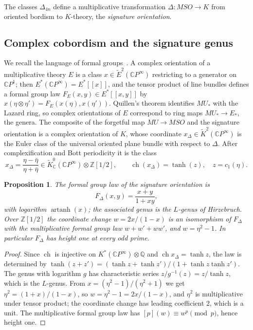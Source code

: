 \documentclass[11pt]{amsart}
\theoremstyle{plain}
\newtheorem{proposition}[theorem]{Proposition}
\theoremstyle{definition}
\numberwithin{equation}{section}
\newcommand{\Z}{\mathbb{Z}}
\newcommand{\Q}{\mathbb{Q}}
\newcommand{\C}{\mathbb{C}}
\newcommand{\CP}{\mathbb{C}P}
\DeclareMathOperator{\ch}{ch}
\begin{document}
The classes $\Delta_{4n}$ define a multiplicative transformation $\Delta\colon MSO\to K$ from oriented bordism to $K$-theory, the \emph{signature orientation}.

\subsection{Complex cobordism and the signature genus}
We recall the language of formal groups~\cite{Quillen,Ravenel}.
A complex orientation of a multiplicative theory $E$ is a class $x\in\widetilde E^2(\CP^\infty)$ restricting to a generator on $\CP^1$; then $E^*(\CP^\infty)=E^*[[x]]$, and the tensor product of line bundles defines a formal group law $F_E(x,y)\in E^*[[x,y]]$ by $x(\eta\otimes\eta')=F_E(x(\eta),x(\eta'))$.
Quillen's theorem identifies $MU_*$ with the Lazard ring, so complex orientations of $E$ correspond to ring maps $MU_*\to E_*$, the genera.
The composite of the forgetful map $MU\to MSO$ and the signature orientation is a complex orientation of $K$, whose coordinate $x_\Delta\in\widetilde K^2(\CP^\infty)$ is the Euler class of the universal oriented plane bundle with respect to $\Delta$.
After complexification and Bott periodicity it is the class
\[
x_\Delta=\frac{\eta-\bar\eta}{\eta+\bar\eta}\in\widetilde K_{\C}^0(\CP^\infty)\otimes\Z[1/2],\qquad \ch(x_\Delta)=\tanh(z),\quad z=c_1(\eta).
\]

\begin{proposition}\label{prop:signatureFGL}
The formal group law of the signature orientation is
\[
F_\Delta(x,y)=\frac{x+y}{1+xy},
\]
with logarithm $\operatorname{artanh}(x)$; the associated genus is the $L$-genus of Hirzebruch.
Over $\Z[1/2]$ the coordinate change $w=2x/(1-x)$ is an isomorphism of $F_\Delta$ with the multiplicative formal group law $w+w'+ww'$, and $w=\eta^2-1$.
In particular $F_\Delta$ has height one at every odd prime.
\end{proposition}

\begin{proof}
Since $\ch$ is injective on $K^*(\CP^\infty)\otimes\Q$ and $\ch x_\Delta=\tanh z$, the law is determined by $\tanh(z+z')=(\tanh z+\tanh z')/(1+\tanh z\tanh z')$.
The genus with logarithm $g$ has characteristic series $z/g^{-1}(z)=z/\tanh z$, which is the $L$-genus.
From $x=(\eta^2-1)/(\eta^2+1)$ we get $\eta^2=(1+x)/(1-x)$, so $w=\eta^2-1=2x/(1-x)$, and $\eta^2$ is multiplicative under tensor product; the coordinate change has leading coefficient $2$, which is a unit.
The multiplicative formal group law has $[p](w)\equiv w^p\pmod p$, hence height one.
\end{proof}
\end{document}
